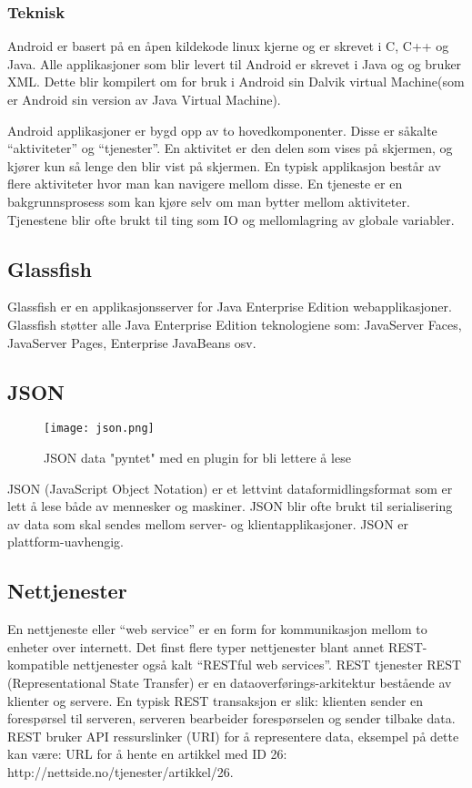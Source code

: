 \documentclass[../main.tex]{subfiles}
\begin{document}
\subsubsection{Teknisk}
Android er basert på en åpen kildekode linux kjerne og er skrevet i C, C++ og Java. Alle applikasjoner som blir levert til Android er skrevet i Java og og bruker XML. Dette blir kompilert om for bruk i Android sin Dalvik virtual Machine(som er Android sin version av Java Virtual Machine).

Android applikasjoner er bygd opp av to hovedkomponenter. Disse er såkalte “aktiviteter” og “tjenester”. En aktivitet er den delen som vises på skjermen, og kjører kun så lenge den blir vist på skjermen. En typisk applikasjon består av flere aktiviteter hvor man kan navigere mellom disse.
En tjeneste er en bakgrunnsprosess som kan kjøre selv om man bytter mellom aktiviteter. Tjenestene blir ofte brukt til ting som IO og mellomlagring av globale variabler.

\subsection{Glassfish}
Glassfish er en applikasjonsserver for Java Enterprise Edition webapplikasjoner. Glassfish støtter alle Java Enterprise Edition teknologiene som: JavaServer Faces, JavaServer Pages, Enterprise JavaBeans osv. 

\subsection{JSON}

\begin{figure}[h!]
  \centering
  \texttt{[image: json.png]}
  \caption{JSON data "pyntet" med en plugin for bli lettere å lese}
\end{figure}

JSON (JavaScript Object Notation) er et lettvint dataformidlingsformat som er lett å lese både av mennesker og maskiner. JSON blir ofte brukt til serialisering av data som skal sendes mellom server- og klientapplikasjoner. JSON er plattform-uavhengig.   

\subsection{Nettjenester}
En nettjeneste eller “web service” er en form for kommunikasjon mellom to enheter over internett. Det finst flere typer nettjenester blant annet REST-kompatible nettjenester også kalt “RESTful web services”. 
REST tjenester
REST (Representational State Transfer) er en dataoverførings-arkitektur bestående av klienter og servere. En typisk REST transaksjon er slik: klienten sender en forespørsel til serveren, serveren bearbeider forespørselen og sender tilbake data. REST bruker API ressurslinker (URI) for å representere data, eksempel på dette kan være: URL for å hente en artikkel med ID 26: http://nettside.no/tjenester/artikkel/26. 
\end{document}
